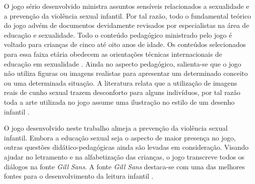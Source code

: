 O jogo sério desenvolvido ministra assuntos sensíveis relacionados a sexualidade e a prevenção da violência sexual infantil. Por tal razão, todo o fundamental teórico do jogo advém de documentos devidamente revisados por especialistas na área de educação e sexualidade. Todo o conteúdo pedagógico ministrado pelo jogo é voltado para crianças de cinco até oito anos de idade. Os conteúdos selecionados para essa faixa etária obedecem as orientações técnicas internacionais de educação em sexualidade \cite{women2018international}. Ainda no aspecto pedagógico, salienta-se que o jogo não utiliza figuras ou imagens realistas para apresentar um determinado conceito ou uma determinada situação. A literatura relata que a utilização de imagens reais de cunho sexual trazem desconforto para alguns indivíduos, por tal razão toda a arte utilizada no jogo assume uma ilustração no estilo de um desenho infantil \cite{jogo2020Albert}.


O jogo desenvolvido neste trabalho almeja a prevenção da violência sexual infantil. Embora a educação sexual seja o aspecto de maior presença no jogo, outras questões didático-pedagógicas ainda são levadas em consideração. Visando ajudar no letramento e na alfabetização das crianças, o jogo transcreve todos os diálogos na fonte \textit{Gill Sans}. A fonte \textit{Gill Sans} destaca-se com uma das melhores fontes para o desenvolvimento da leitura infantil \cite{lourencco2011tipografia}. 


